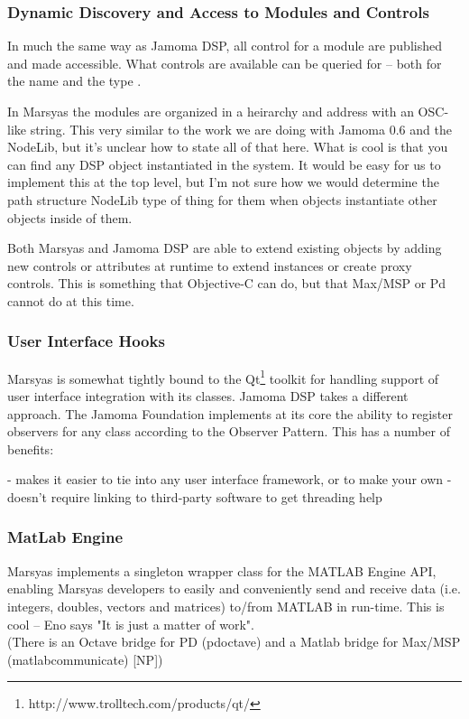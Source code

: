 \documentclass[twoside,10pt]{article}
\begin{document}
\subsubsection{Dynamic Discovery and Access to Modules and Controls}

In much the same way as Jamoma DSP, all control for a module are published and made accessible.  What controls are available can be queried for -- both for the name and the type  \cite{Tzanetakis:2006}.  

In Marsyas the modules are organized in a heirarchy and address with an OSC-like string.  This very similar to the work we are doing with Jamoma 0.6 and the NodeLib, but it's unclear how to state all of that here.  What is cool is that you can find any DSP object instantiated in the system.  It would be easy for us to implement this at the top level, but I'm not sure how we would determine the path structure NodeLib type of thing for them when objects instantiate other objects inside of them.

Both Marsyas and Jamoma DSP are able to extend existing objects by adding new controls or attributes at runtime to extend instances or create proxy controls.  This is something that Objective-C can do, but that Max/MSP or Pd cannot do at this time.

\subsubsection{User Interface Hooks}

Marsyas is somewhat tightly bound to the Qt\footnote{http://www.trolltech.com/products/qt/} toolkit for handling support of user interface integration with its classes.  Jamoma DSP takes a different approach.  The Jamoma Foundation implements at its core the ability to register observers for any class according to the Observer Pattern\cite{Gamma:1995}.  This has a number of benefits:

- makes it easier to tie into any user interface framework, or to make your own
- doesn't require linking to third-party software to get threading help

\subsubsection{MatLab Engine}

Marsyas implements a singleton wrapper class for the MATLAB Engine API, enabling Marsyas developers to easily and conveniently send and receive data (i.e. integers, doubles, vectors and matrices) to/from MATLAB in run-time.  This is cool -- Eno says "It is just a matter of work".   \\
(There is an Octave bridge for PD (pdoctave) and a Matlab bridge for Max/MSP (matlabcommunicate) [NP])
\end{document}
